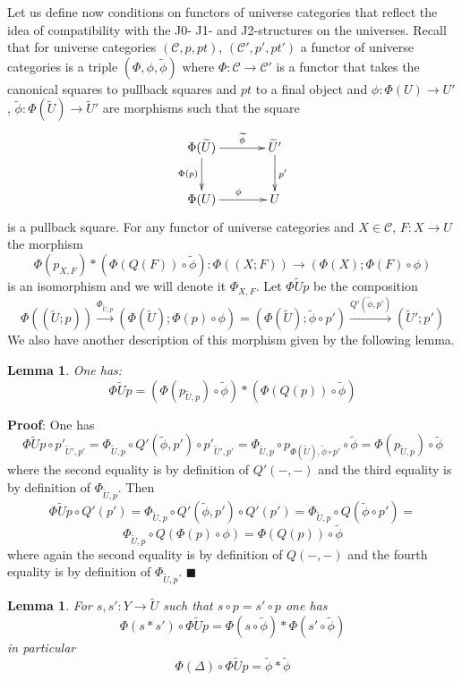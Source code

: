 \documentclass[12pt]{article}
\numberwithin{equation}{section}
\newenvironment{eq}{\begin{equation}}{\end{equation}}
\newenvironment{myproof}{{\bf Proof}:}{$\blacksquare$ \vskip 5mm }
\newtheorem{lemma}[proposition]{Lemma}
\newcommand{\llabel}[1]{\label{#1}}
\newcommand{\sr}{\rightarrow}
\newcommand{\lr}{\longrightarrow}
\newcommand{\wt}{\widetilde}
\begin{document}
Let us define now conditions on functors of universe categories that reflect
the idea of compatibility with the J0- J1- and J2-structures on the
universes. Recall that for universe categories $({\mathcal C},p,pt)$,
$({\mathcal C}',p',pt')$ a functor of universe categories is a triple
$(\Phi,\phi,\wt{\phi})$ where $\Phi:{\mathcal C}\sr {\mathcal C}'$ is a functor
that takes the canonical squares to pullback squares and $pt$ to a final object
and $\phi:\Phi(U)\sr U'$, $\wt{\phi}:\Phi(\wt{U})\sr \wt{U}'$ are morphisms
such that the square
%
\begin{eq}\llabel{2015.04.06.eq10}
\begin{xy}
          \xymatrix@C=3pc{ \Phi(\wt{U}) \ar[r]^-{\wt{\phi}} \ar[d]_{\Phi(p)} &
            \wt{U}' \ar[d]^{p'}\\ \Phi(U) \ar[r]^{\phi} & U }
\end{xy}
\end{eq}
%
is a pullback square. For any functor of universe categories and $X\in{\mathcal
  C}$, $F:X\sr U$ the morphism
%
$$\Phi(p_{X,F})*(\Phi(Q(F))\circ\wt{\phi}):\Phi((X;F))\sr
(\Phi(X);\Phi(F)\circ\phi)$$
%
is an isomorphism and we will denote it $\Phi_{X,F}$. Let $\Phi\wt{U}p$ be the
composition
%
$$\Phi((\wt{U};p)) \stackrel{\Phi_{\wt{U},p}}{\lr} (\Phi(\wt{U});\Phi(p)\circ
\phi)=(\Phi(\wt{U});\wt{\phi}\circ p')\stackrel{Q'(\wt{\phi},p')}{\lr}
(\wt{U}';p')$$
%
We also have another description of this morphism given by the following lemma.
%
\begin{lemma}
\llabel{2015.04.10.l5} One has:
%
$$\Phi\wt{U}p=(\Phi(p_{\wt{U},p})\circ\wt{\phi})*(\Phi(Q(p))\circ\wt{\phi})$$
%
\end{lemma}
%
\begin{myproof}
One has
%
$$\Phi\wt{U}p\circ p'_{\wt{U}',p'}=\Phi_{\wt{U},p}\circ Q'(\wt{\phi},p')\circ
p'_{\wt{U}',p'} =\Phi_{\wt{U},p}\circ p_{\Phi(\wt{U}),\wt{\phi}\circ
  p'}\circ\wt{\phi}=\Phi(p_{\wt{U},p})\circ \wt{\phi}$$
%
where the second equality is by definition of $Q'(-,-)$ and the third equality
is by definition of $\Phi_{\wt{U},p}$. Then
%
$$\Phi\wt{U}p\circ Q'(p')=\Phi_{\wt{U},p}\circ Q'(\wt{\phi},p')\circ
Q'(p')=\Phi_{\wt{U},p}\circ Q(\wt{\phi}\circ p')=$$$$\Phi_{\wt{U},p}\circ
Q(\Phi(p)\circ \phi)=\Phi(Q(p))\circ \wt{\phi}$$
%
where again the second equality is by definition of $Q(-,-)$ and the fourth
equality is by definition of $\Phi_{\wt{U},p}$.
\end{myproof}
%
\begin{lemma}
\llabel{2015.04.10.l6} For $s,s':Y\sr \wt{U}$ such that $s\circ p=s'\circ p$
one has
%
$$\Phi(s*s')\circ\Phi\wt{U}p=\Phi(s\circ \wt{\phi})*\Phi(s'\circ\wt{\phi})$$
%
in particular
%
$$\Phi(\Delta)\circ \Phi\wt{U}p = \wt{\phi}*\wt{\phi}$$
%
\end{lemma}
\end{document}

